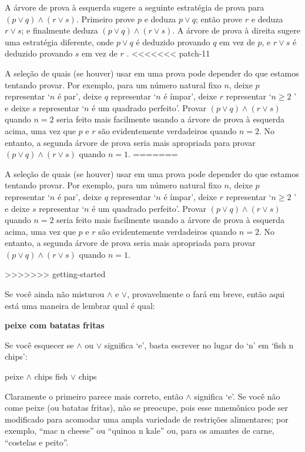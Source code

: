 \begin{itemizar}
\begin{strategy}
\begin{example}
A árvore de prova à esquerda sugere a seguinte estratégia de prova para $(p \vee q) \wedge (r \vee s)$. Primeiro prove $p$ e deduza $p \vee q$; então prove $r$ e deduza $r \vee s$; e finalmente deduza $(p \vee q) \wedge (r \vee s)$. A árvore de prova à direita sugere uma estratégia diferente, onde $p \vee q$ é deduzido provando $q$ em vez de $p$, e $r \vee s$ é deduzido provando $s$ em vez de $r$ .
<<<<<<< patch-11

A seleção de quais (se houver) usar em uma prova pode depender do que estamos tentando provar. Por exemplo, para um número natural fixo $n$, deixe $p$ representar `$n$ é par', deixe $q$ representar `$n$ é ímpar', deixe $r$ representar `$n \ge 2$ ' e deixe $s$ representar `$n$ é um quadrado perfeito'. Provar $(p \vee q) \wedge (r \vee s)$ quando $n=2$ seria feito mais facilmente usando a árvore de prova à esquerda acima, uma vez que $p$ e $r$ são evidentemente verdadeiros quando $ n=2$. No entanto, a segunda árvore de prova seria mais apropriada para provar $(p \vee q) \wedge (r \vee s)$ quando $n=1$.
=======

A seleção de quais (se houver) usar em uma prova pode depender do que estamos tentando provar. Por exemplo, para um número natural fixo $n$, deixe $p$ representar `$n$ é par', deixe $q$ representar `$n$ é ímpar', deixe $r$ representar `$n \ge 2$ ' e deixe $s$ representar `$n$ é um quadrado perfeito'. Provar $(p \vee q) \wedge (r \vee s)$ quando $n=2$ seria feito mais facilmente usando a árvore de prova à esquerda acima, uma vez que $p$ e $r$ são evidentemente verdadeiros quando $ n=2$. No entanto, a segunda árvore de prova seria mais apropriada para provar $(p \vee q) \wedge (r \vee s)$ quando $n=1$.

>>>>>>> getting-started
\end{example}

\begin{aside}
Se você ainda não misturou $\wedge$ e $\vee$, provavelmente o fará em breve, então aqui está uma maneira de lembrar qual é qual:
\begin{center} \vspace{-10pt} \large \textbf{peixe com batatas fritas} \end{center}
\vspace{-10pt} Se você esquecer se $\wedge$ ou $\vee$ significa `e', basta escrever no lugar do `n' em `fish n chips':
\begin{center} \vspace{-10pt} peixe $\wedge$ chips \qquad \qquad fish $\vee$ chips \end{center}
\vspace{-10pt} Claramente o primeiro parece mais correto, então $\wedge$ significa `e'. Se você não come peixe (ou batatas fritas), não se preocupe, pois esse mnemônico pode ser modificado para acomodar uma ampla variedade de restrições alimentares; por exemplo, “mac n cheese” ou “quinoa n kale” ou, para os amantes de carne, “costelas e peito”.
\end{aside}


\end{strategy}
\end{itemizar}

